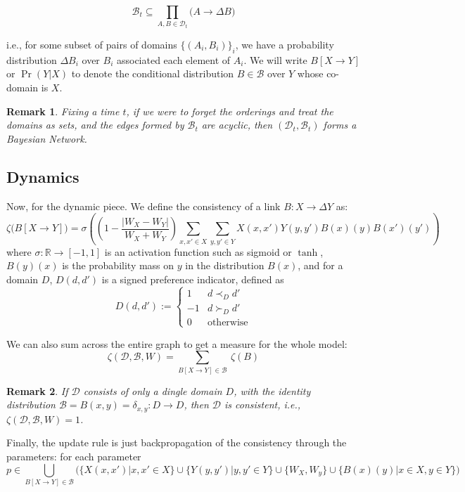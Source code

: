 \documentclass{article}
\newtheorem*{remark}{Remark}
\begin{document}
	\[  \mathcal B_t \subseteq \prod_{A, B \in \mathcal D_t} \Big( A \to \Delta B \Big) \] 
	
	i.e., for some subset of pairs of domains $\{ (A_i, B_i) \}_i$, we have a probability distribution $\Delta B_i$ over $B_i$ associated each element of $A_i$. We will write $B [X \to Y]$ or $\Pr(Y | X)$ to denote the conditional distribution $B \in \mathcal B$ over $Y$ whose co-domain is $X$.
	
	
	\begin{remark}
		Fixing a time $t$, if we were to forget the orderings and treat the domains as sets, and the edges formed by $\mathcal B_t$ are acyclic, then $(\mathcal D_t, \mathcal B_t)$ forms a Bayesian Network.
	\end{remark}
 
 	
 	
 	\subsection{Dynamics}
	
 	Now, for the dynamic piece. We define the consistency of a link $B : X \to \Delta Y$ as: 	
 	\[ \zeta\big(B[X \to Y]\big) =  \sigma \left( \left(1- \frac{|W_X - W_Y|}{W_X + W_Y}\right) \sum_{x,x' \in X}\sum_{y,y' \in Y} X(x,x') Y(y,y') B(x)(y) B(x')(y') \right) \]
 	where $\sigma : \mathbb R \to [-1, 1]$ is an activation function such as sigmoid or $\tanh$, $B(y)(x)$ is the probability mass on $y$ in the distribution $B(x)$, and for a domain $D$, $D(d, d')$ is a signed preference indicator, defined as 
 	\[ D(d, d') := \begin{cases}
 		1 & d \prec_D d' \\
 		-1 & d \succ_D d' \\
 		0 & \text{otherwise}
 	\end{cases} \]
 	 	
 	We can also sum across the entire graph to get a measure for the whole model:
 	\[ \zeta(\mathcal D, \mathcal B, W) = \sum_{B[X\to Y] \in \mathcal B}~ \zeta(B) \]
 	
 	
 	\begin{remark}
 		If $\mathcal D$ consists of only a dingle domain $D$, with the identity distribution $\mathcal B = {B(x,y) = \delta_{x,y}: D \to D}$, then $\mathcal D$ is consistent, i.e., $\zeta(\mathcal D, \mathcal B, W) = 1$.
 	\end{remark}
 	
 	Finally, the update rule is just backpropagation of the consistency through the parameters: for each parameter 
 	\[ p \in \bigcup_{B[X\to Y] \in \mathcal B}  \Bigg( \{ X(x,x') | x, x' \in X\} \cup \{ Y(y, y') | y,y' \in Y\} \cup \{ W_X, W_y \} \cup \{B(x)(y) | x \in X, y \in Y\}  \Bigg) \]
\end{document}
